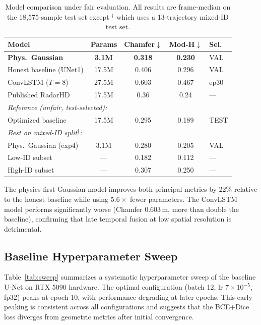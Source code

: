 \documentclass[conference]{IEEEtran}
\begin{document}
\begin{table}[t]
\centering
\caption{Model comparison under fair evaluation. All results are frame-median on the 18,575-sample test set except $^\dagger$ which uses a 13-trajectory mixed-ID test set.}
\label{tab:main_results}
\footnotesize
\begin{tabular}{lcccl}
\toprule
Model & Params & Chamfer$\downarrow$ & Mod-H$\downarrow$ & Sel. \\
\midrule
\textbf{Phys.\ Gaussian} & \textbf{3.1M} & \textbf{0.318} & \textbf{0.230} & VAL \\
Honest baseline (UNet1) & 17.5M & 0.406 & 0.296 & VAL \\
ConvLSTM ($T\!=\!8$) & 27.5M & 0.603 & 0.467 & ep30 \\
Published RadarHD~\cite{prabhakara2023radarhd} & 17.5M & 0.36 & 0.24 & --- \\
\midrule
\multicolumn{5}{l}{\textit{Reference (unfair, test-selected):}} \\
Optimized baseline & 17.5M & 0.295 & 0.189 & TEST \\
\midrule
\multicolumn{5}{l}{\textit{Best on mixed-ID split$^\dagger$:}} \\
Phys.\ Gaussian (exp4) & 3.1M & 0.280 & 0.205 & VAL \\
\quad Low-ID subset & --- & 0.182 & 0.112 & --- \\
\quad High-ID subset & --- & 0.307 & 0.250 & --- \\
\bottomrule
\end{tabular}
\end{table}

The physics-first Gaussian model improves both principal metrics by 22\% relative to the honest baseline while using $5.6\times$ fewer parameters.
The ConvLSTM model performs significantly worse (Chamfer 0.603\,m, more than double the baseline), confirming that late temporal fusion at low spatial resolution is detrimental.

\subsection{Baseline Hyperparameter Sweep}

Table~\ref{tab:sweep} summarizes a systematic hyperparameter sweep of the baseline U-Net on RTX 5090 hardware.
The optimal configuration (batch 12, lr $7\!\times\!10^{-5}$, fp32) peaks at epoch 10, with performance degrading at later epochs.
This early peaking is consistent across all configurations and suggests that the BCE+Dice loss diverges from geometric metrics after initial convergence.
\end{document}
